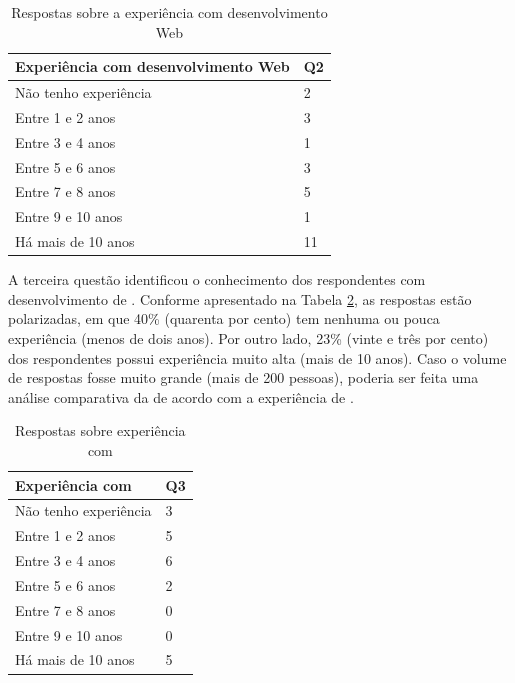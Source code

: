\begin{table}[!bth] 
\centering
\vspace{0.5cm}
\scriptsize
\begin{tabular}{p{3cm}|p{1cm}}
\hline   
Experiência com desenvolvimento Web& Q2 \\
\hline   
\cellcolor{light-gray}Não tenho experiência &  \cellcolor{light-gray}2  \\
\cellcolor{light-gray}Entre 1 e 2 anos      &  \cellcolor{light-gray}3  \\
Entre 3 e 4 anos      &  1  \\
Entre 5 e 6 anos      &  3  \\
Entre 7 e 8 anos      &  5  \\
Entre 9 e 10 anos     &  1  \\
Há mais de 10 anos    & 11  \\
\end{tabular}
\caption{Respostas sobre a experiência com desenvolvimento Web}
\label{quantidadeRespostas2}
\end{table}

A terceira questão identificou o conhecimento dos respondentes com
desenvolvimento de \wss{}. Conforme apresentado na Tabela
\ref{quantidadeRespostas3}, as respostas estão polarizadas, em que 40\%
(quarenta por cento) tem nenhuma ou pouca experiência (menos de dois anos). Por
outro lado, 23\% (vinte e três por cento) dos respondentes possui experiência
muito alta (mais de 10 anos). Caso o volume de respostas fosse muito grande (mais de
200 pessoas), poderia ser feita uma análise comparativa da \neoidl{} de acordo
com a experiência de \ws{}.


\begin{table}[!bth] 
\centering
\vspace{0.5cm}
\scriptsize
\begin{tabular}{p{3cm}|p{1cm}}
\hline   
Experiência com \ws{} & Q3 \\
\hline   
Não tenho experiência &  3  \\
Entre 1 e 2 anos      &  5  \\
Entre 3 e 4 anos      &  6  \\
Entre 5 e 6 anos      &  2  \\
Entre 7 e 8 anos      &  0  \\
Entre 9 e 10 anos     &  0  \\
Há mais de 10 anos    &  5  \\
\end{tabular}
\caption{Respostas sobre experiência com \wss{}}
\label{quantidadeRespostas3}
\end{table}        

